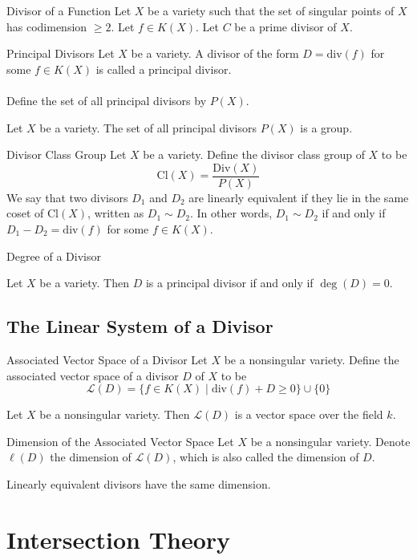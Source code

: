 \documentclass[a4paper]{article}
\begin{document}
\begin{defn}{Divisor of a Function}{} Let $X$ be a variety such that the set of singular points of $X$ has codimension $\geq 2$. Let $f\in K(X)$. Let $C$ be a prime divisor of $X$. 
\end{defn}

\begin{defn}{Principal Divisors}{} Let $X$ be a variety. A divisor of the form $D=\text{div}(f)$ for some $f\in K(X)$ is called a principal divisor. \\~\\
Define the set of all principal divisors by $P(X)$. 
\end{defn}

\begin{prp}{}{} Let $X$ be a variety. The set of all principal divisors $P(X)$ is a group. 
\end{prp}

\begin{defn}{Divisor Class Group}{} Let $X$ be a variety. Define the divisor class group of $X$ to be $$\text{Cl}(X)=\frac{\text{Div}(X)}{P(X)}$$
We say that two divisors $D_1$ and $D_2$ are linearly equivalent if they lie in the same coset of $\text{Cl}(X)$, written as $D_1\sim D_2$. In other words, $D_1\sim D_2$ if and only if $D_1-D_2=\text{div}(f)$ for some $f\in K(X)$. 
\end{defn}

\begin{defn}{Degree of a Divisor}{}
\end{defn}

\begin{prp}{}{} Let $X$ be a variety. Then $D$ is a principal divisor if and only if $\deg(D)=0$. 
\end{prp}

\subsection{The Linear System of a Divisor}
\begin{defn}{Associated Vector Space of a Divisor}{} Let $X$ be a nonsingular variety. Define the associated vector space of a divisor $D$ of $X$ to be $$\mathcal{L}(D)=\{f\in K(X)\;|\;\text{div}(f)+D\geq 0\}\cup\{0\}$$
\end{defn}

\begin{lmm}{}{} Let $X$ be a nonsingular variety. Then $\mathcal{L}(D)$ is a vector space over the field $k$. 
\end{lmm}

\begin{defn}{Dimension of the Associated Vector Space}{} Let $X$ be a nonsingular variety. Denote $\ell(D)$ the dimension of $\mathcal{L}(D)$, which is also called the dimension of $D$. 
\end{defn}

\begin{thm}{}{} Linearly equivalent divisors have the same dimension. 
\end{thm}

\pagebreak
\section{Intersection Theory}
\end{document}
